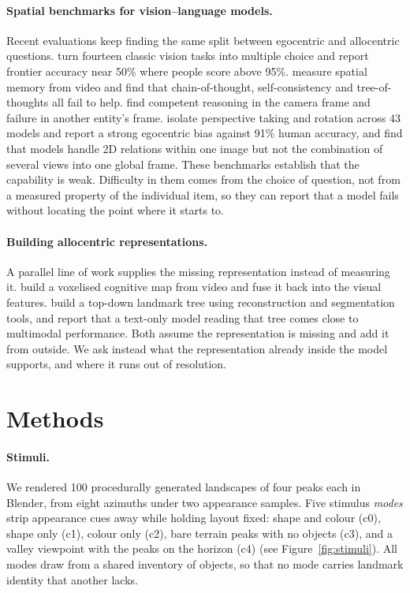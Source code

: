 \documentclass{article}
\begin{document}
\paragraph{Spatial benchmarks for vision--language models.}
Recent evaluations keep finding the same split between egocentric and allocentric questions. \citet{fu2024blink} turn fourteen classic vision tasks into multiple choice and report frontier accuracy near 50\% where people score above 95\%. \citet{yang2024thinking} measure spatial memory from video and find that chain-of-thought, self-consistency and tree-of-thoughts all fail to help. \citet{li2025viewspatial} find competent reasoning in the camera frame and failure in another entity's frame. \citet{zhang2025spinbench} isolate perspective taking and rotation across 43 models and report a strong egocentric bias against 91\% human accuracy, and \citet{zhang2026multiview} find that models handle 2D relations within one image but not the combination of several views into one global frame. These benchmarks establish that the capability is weak. Difficulty in them comes from the choice of question, not from a measured property of the individual item, so they can report that a model fails without locating the point where it starts to.

\paragraph{Building allocentric representations.}
A parallel line of work supplies the missing representation instead of measuring it.  \citet{gu2026spacemind} build a voxelised cognitive map from video and fuse it back into the visual features. \citet{ruan2026world2mind} build a top-down landmark tree using reconstruction and segmentation tools, and report that a text-only model reading that tree comes close to multimodal performance. Both assume the representation is missing and add it from outside. We ask instead what the representation already inside the model supports, and where it runs out of resolution.

\section{Methods}

\paragraph{Stimuli.}
We rendered 100 procedurally generated landscapes of four peaks each in Blender, from eight azimuths under two appearance samples. Five stimulus \emph{modes} strip appearance cues away while holding layout fixed: shape and colour (c0), shape only (c1), colour only (c2), bare terrain peaks with no objects (c3), and a valley viewpoint with the peaks on the horizon (c4) (see Figure~\ref{fig:stimuli}). All modes draw from a shared inventory of objects, so that no mode carries landmark identity that another lacks.
\end{document}
